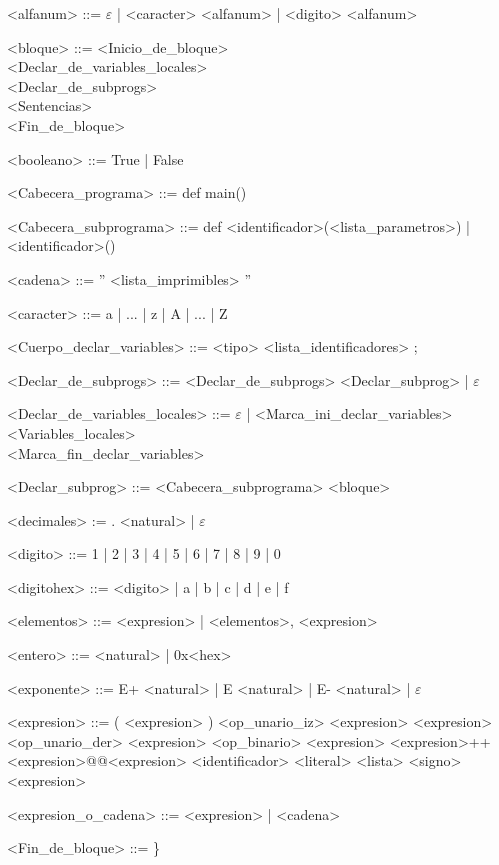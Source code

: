 \setlength{\grammarparsep}{4pt plus 1pt minus 1pt}

\begin{grammar}

<alfanum> ::= $\varepsilon$ | <caracter> <alfanum> | <digito> <alfanum>

<bloque> ::= <Inicio_de_bloque> \\
 <Declar_de_variables_locales> \\
 <Declar_de_subprogs> \\
 <Sentencias> \\
 <Fin_de_bloque>

<booleano> ::= True | False

<Cabecera_programa> ::= def main()

<Cabecera_subprograma> ::= def <identificador>(<lista_parametros>) | <identificador>()

<cadena> ::= '' <lista_imprimibles> ''

<caracter> ::= a | ... | z | A | ... | Z

<Cuerpo_declar_variables> ::= <tipo> <lista_identificadores> ;

<Declar_de_subprogs> ::= <Declar_de_subprogs> <Declar_subprog> | $\varepsilon$

<Declar_de_variables_locales> ::= $\varepsilon$ | <Marca_ini_declar_variables> \\
<Variables_locales> \\
<Marca_fin_declar_variables>

<Declar_subprog> ::= <Cabecera_subprograma> <bloque>

<decimales> := . <natural> | $\varepsilon$

<digito> ::= 1 | 2 | 3 | 4 | 5 | 6 | 7 | 8 | 9 | 0

<digitohex> ::= <digito> | a | b | c | d | e | f

<elementos> ::= <expresion> | <elementos>, <expresion>

<entero> ::= <natural> | 0x<hex>

<exponente> ::= E+ <natural> | E <natural> | E- <natural> | $\varepsilon$

<expresion> ::= ( <expresion> )
\alt <op_unario_iz> <expresion>
\alt <expresion> <op_unario_der>
\alt <expresion> <op_binario> <expresion>
\alt <expresion>++<expresion>@@<expresion>
\alt <identificador>
\alt <literal>
\alt <lista>
\alt <signo> <expresion>

<expresion_o_cadena> ::= <expresion> | <cadena>

<Fin_de_bloque> ::= \}


\end{grammar}
